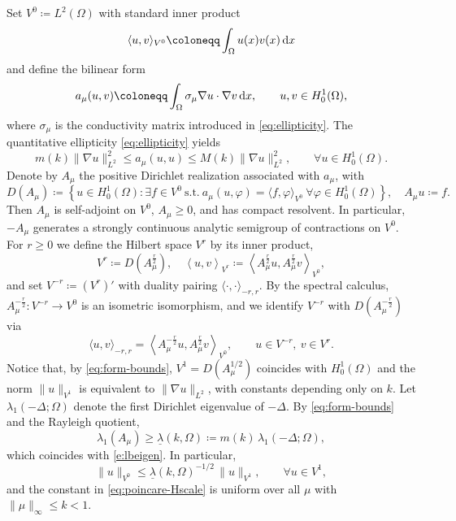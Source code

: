 \documentclass[12pt,leqno]{amsart}
\def\d{{\rm d}}
\theoremstyle{definition}
\numberwithin{equation}{section}
\numberwithin{figure}{section}
\begin{document}
Set $V^0\coloneqq L^{2}(\Omega)$ with standard inner product \[
\langle u,v \rangle_{V^0}\coloneqq \int_\Omega u(x)  {v(x)} \,\d x\] and define  the bilinear form
\begin{equation}\label{eq:form-a-mu}
a_{\mu}(u,v)\coloneqq\int_{\Omega}\sigma_{\mu}\nabla u\cdot \nabla v\,\d x,
\qquad u,v\in H^{1}_{0}(\Omega),
\end{equation}
where $\sigma_{\mu}$ is the conductivity matrix introduced in
\eqref{eq:ellipticity}. The quantitative ellipticity \eqref{eq:ellipticity} yields
\begin{equation}\label{eq:form-bounds}
m(k)\|\nabla u\|_{L^{2}}^{2}\le a_{\mu}(u,u)\le M(k)\|\nabla u\|_{L^{2}}^{2},
\qquad \forall u\in H^{1}_{0}(\Omega).
\end{equation}
Denote by $A_{\mu}$ the positive Dirichlet realization associated with $a_{\mu}$, with
\[
D(A_{\mu})\coloneqq\left\{u\in H^{1}_{0}(\Omega): \exists f\in {V^0}\ \text{s.t.}\
a_{\mu}(u,\varphi)=\langle f,\varphi\rangle_{{V^0}}\ \forall \varphi\in H^{1}_{0}(\Omega)\right\},
\quad A_{\mu}u\coloneqq f.
\]
Then $A_{\mu}$ is self-adjoint on ${V^0}$, $A_{\mu}\ge0$, and has compact resolvent.
In particular, $-A_{\mu}$ generates a strongly continuous analytic semigroup of contractions
on ${V^0}$.
For $r\geq 0$ we define the Hilbert space  ${V^r}$ by its inner product, 
\[V^r \coloneqq D\left(A_{\mu}^{{\frac{r}{2}}}\right), \quad \left\langle  u, v\right\rangle_{V^r}\coloneqq
\left\langle A_\mu^{{\frac{r}{2}}}u,A_\mu^{{\frac{r}{2}}}v\right\rangle_{V^0},
\]
and set ${V^{-r}}\coloneqq (V^r)'$ with duality pairing
$\langle\cdot,\cdot\rangle_{-r,r}$.
By the spectral calculus, $A_\mu^{-{\frac{r}{2}}}:{V^{-r}}\to V^0$ is an isometric isomorphism,
and we identify ${V^{-r}}$ with $D(A_\mu^{-{\frac{r}{2}}})$ via
\begin{equation}\label{eq:duality-Hminus-Hplus}
\langle u,v\rangle_{-r,r}
= \left\langle A_\mu^{-{\frac{r}{2}}}u,A_\mu^{{\frac{r}{2}}}v\right\rangle_{V^0},
\qquad u\in {V^{-r}},\ v\in V^r.
\end{equation}
Notice that, by \eqref{eq:form-bounds}, ${V^1}=D(A_{\mu}^{1/2})$ coincides with
$H^{1}_{0}(\Omega)$ and the norm $\|u\|_{{V^1}}$ is equivalent to $\|\nabla u\|_{L^{2}}$,
with constants depending only on $k$.
Let $\lambda_{1}(-\Delta;\Omega)$ denote the first Dirichlet eigenvalue of $-\Delta$.
By \eqref{eq:form-bounds} and the Rayleigh quotient,
\begin{equation}\label{eq:uniform-coercivity}
\lambda_{1}(A_{\mu})\ge \underline{\lambda}(k,\Omega)\coloneqq m(k)\,\lambda_{1}(-\Delta;\Omega),
\end{equation}
which coincides with \eqref{e:lbeigen}. In particular,
\begin{equation}\label{eq:poincare-Hscale}
\|u\|_{{V^0}}\le \underline{\lambda}(k,\Omega)^{-1/2}\,\|u\|_{{V^1}},
\qquad \forall u\in {V^1},
\end{equation}
and the constant in \eqref{eq:poincare-Hscale} is uniform over all $\mu$ with
$\|\mu\|_{\infty}\le k<1$.
\end{document}
